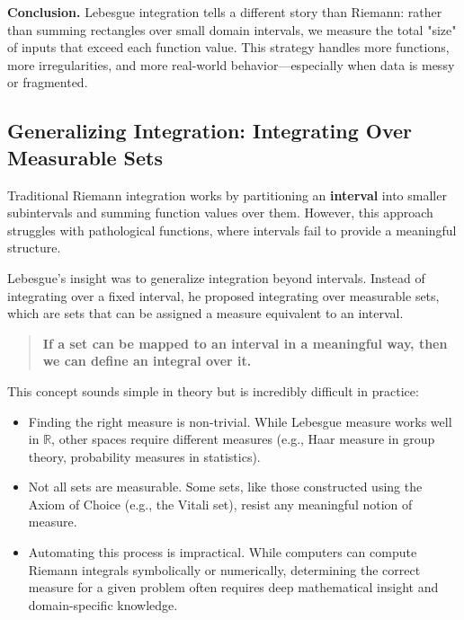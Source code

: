 \vspace{1em}
\noindent
\textbf{Conclusion.} Lebesgue integration tells a different story than Riemann: rather than summing rectangles over small domain intervals, we measure the total "size" of inputs that exceed each function value. This strategy handles more functions, more irregularities, and more real-world behavior—especially when data is messy or fragmented.





\subsection{Generalizing Integration: Integrating Over Measurable Sets}

Traditional Riemann integration works by partitioning an \textbf{interval} into smaller subintervals and summing function values over them. However, this approach struggles with pathological functions, where intervals fail to provide a meaningful structure.

Lebesgue's insight was to generalize integration beyond intervals. Instead of integrating over a fixed interval, he proposed integrating over measurable sets, which are sets that can be assigned a measure equivalent to an interval.

\begin{quote}
\textbf{If a set can be mapped to an interval in a meaningful way, then we can define an integral over it.}
\end{quote}

This concept sounds simple in theory but is incredibly difficult in practice:

\begin{itemize}
    \item Finding the right measure is non-trivial. While Lebesgue measure works well in \(\mathbb{R}\), other spaces require different measures (e.g., Haar measure in group theory, probability measures in statistics).
    \item Not all sets are measurable. Some sets, like those constructed using the Axiom of Choice (e.g., the Vitali set), resist any meaningful notion of measure.
    \item Automating this process is impractical. While computers can compute Riemann integrals symbolically or numerically, determining the correct measure for a given problem often requires deep mathematical insight and domain-specific knowledge.
\end{itemize}

